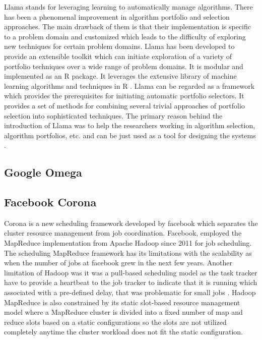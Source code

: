      Llama stands for leveraging learning to automatically manage
     algorithms. There has been a phenomenal improvement in algorithm
     portfolio and selection approaches. The main drawback of them is
     that their implementation is specific to a problem domain and
     customized which leads to the difficulty of exploring new
     techniques for certain problem domains. Llama has been developed
     to provide an extensible toolkit which can initiate exploration
     of a variety of portfolio techniques over a wide range of problem
     domains. It is modular and implemented as an R package. It
     leverages the extensive library of machine learning algorithms
     and techniques in R \cite{lla1}. Llama can be regarded as a
     framework which provides the prerequisites for initiating
     automatic portfolio selectors. It provides a set of methods for
     combining several trivial approaches of portfolio selection into
     sophisticated techniques. The primary reason behind the
     introduction of Llama was to help the researchers working in
     algorithm selection, algorithm portfolios, etc. and can be just
     used as a tool for designing the systems \cite{lla1}.
     
\subsection{Google Omega}
\subsection{Facebook Corona}

     Corona is a new scheduling framework developed by facebook which
     separates the cluster resource management from job coordination.
     Facebook, employed the MapReduce implementation from Apache
     Hadoop since 2011 for job scheduling. The scheduling MapReduce
     framework has its limitations with the scalability as when the
     number of jobs at facebook grew in the next few years. Another
     limitation of Hadoop was it was a pull-based scheduling model as
     the task tracker have to provide a heartbeat to the job tracker to
     indicate that it is running which associated with a pre-defined
     delay, that was problematic for small jobs 
     \cite{www-facebook-corona}. Hadoop MapReduce is also constrained
     by its static slot-based resource management model where a
     MapReduce cluster is divided into a fixed number of map and
     reduce slots based on a static configurations so the slots are
     not utilized completely anytime the cluster workload does not fit
     the static configuration.

